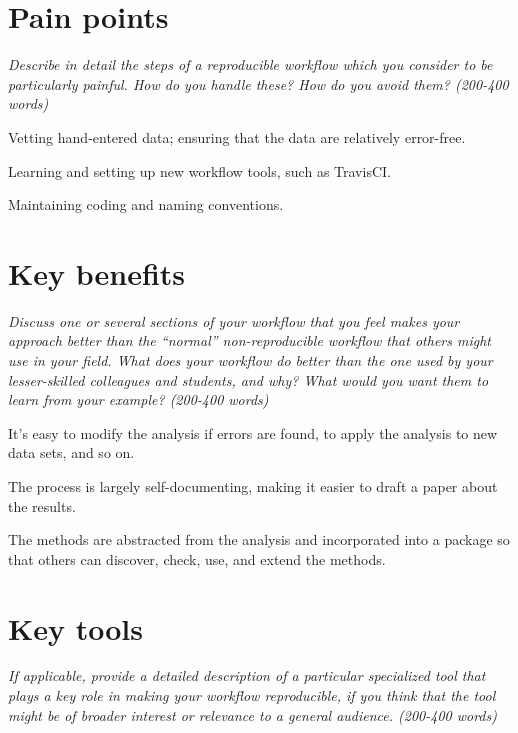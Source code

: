 \documentclass[]{article}
\begin{document}
\section{Pain points}\label{pain-points}

\emph{Describe in detail the steps of a reproducible workflow which you
consider to be particularly painful. How do you handle these? How do you
avoid them? (200-400 words)}

Vetting hand-entered data; ensuring that the data are relatively
error-free.

Learning and setting up new workflow tools, such as TravisCI.

Maintaining coding and naming conventions.

\section{Key benefits}\label{key-benefits}

\emph{Discuss one or several sections of your workflow that you feel
makes your approach better than the ``normal'' non-reproducible workflow
that others might use in your field. What does your workflow do better
than the one used by your lesser-skilled colleagues and students, and
why? What would you want them to learn from your example? (200-400
words)}

It's easy to modify the analysis if errors are found, to apply the
analysis to new data sets, and so on.

The process is largely self-documenting, making it easier to draft a
paper about the results.

The methods are abstracted from the analysis and incorporated into a
package so that others can discover, check, use, and extend the
methods.

\section{Key tools}\label{key-tools}

\emph{If applicable, provide a detailed description of a particular
specialized tool that plays a key role in making your workflow
reproducible, if you think that the tool might be of broader interest or
relevance to a general audience. (200-400 words)}
\end{document}
